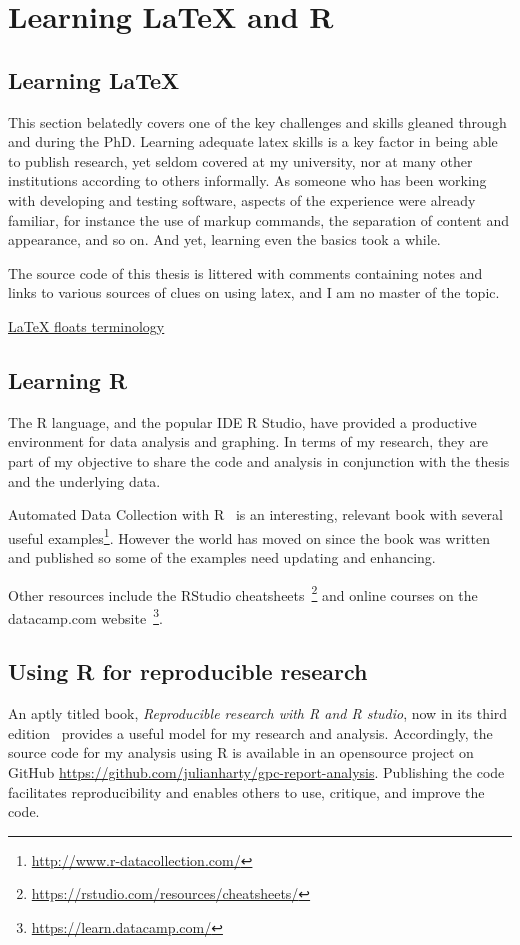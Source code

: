 \chapter{Learning LaTeX and R}


\section{Learning LaTeX}
This section belatedly covers one of the key challenges and skills gleaned through and during the PhD. Learning adequate latex skills is a key factor in being able to publish research, yet seldom covered at my university, nor at many other institutions according to others informally.
As someone who has been working with developing and testing software, aspects of the experience were already familiar, for instance the use of markup commands, the separation of content and appearance, and so on. And yet, learning even the basics took a while. 

The source code of this thesis is littered with comments containing notes and links to various sources of clues on using latex, and I am no master of the topic.

\href{https://tex.stackexchange.com/questions/39017/how-to-influence-the-position-of-float-environments-like-figure-and-table-in-lat/39020#39020}{LaTeX floats terminology}

\section{Learning R}

The R language, and the popular IDE R Studio, have provided a productive environment for data analysis and graphing. In terms of my research, they are part of my objective to share the code and analysis in conjunction with the thesis and the underlying data.

Automated Data Collection with R~\cite{munzert2014automated} is an interesting, relevant book with several useful examples\footnote{\url{http://www.r-datacollection.com/}}. However the world has moved on since the book was written and published so some of the examples need updating and enhancing.

Other resources include the RStudio cheatsheets~\footnote{\url{https://rstudio.com/resources/cheatsheets/}} and online courses on the datacamp.com website~\footnote{\url{https://learn.datacamp.com/}}.

\section{Using R for reproducible research}
An aptly titled book, \emph{Reproducible research with R and R studio}, now in its third edition~\cite{gandrud2020reproducible} provides a useful model for my research and analysis. Accordingly, the source code for my analysis using R is available in an opensource project on GitHub \url{https://github.com/julianharty/gpc-report-analysis}. Publishing the code facilitates reproducibility and enables others to use, critique, and improve the code.

